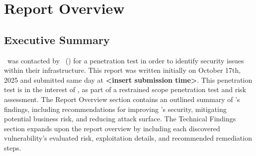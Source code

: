 \section{Report Overview}
\subsection{Executive Summary}
    \teamname\ was contacted by \client\ (\cptc) for a penetration test in order to identify security issues within their infrastructure. This report was written initially on October 17th, 2025 and submitted same day at \textbf{<insert submission time>}. This penetration test is in the interest of \cptc, as part of a restrained scope penetration test and risk assessment. The Report Overview section contains an outlined summary of \teamname's findings, including recommendations for improving \cptc's security, mitigating potential business risk, and reducing attack surface. The Technical Findings section expands upon the report overview by including each discovered vulnerability's evaluated risk, exploitation details, and recommended remediation steps.
    

